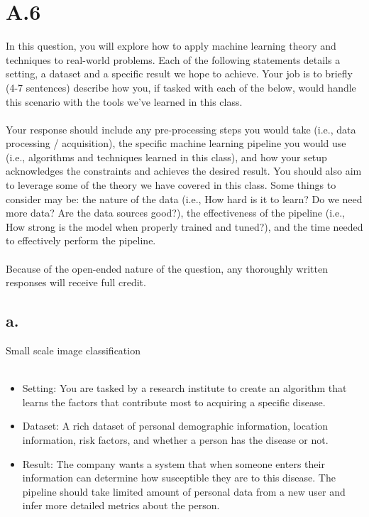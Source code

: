 \documentclass{article}
\newcommand{\1}{\mathbf{1}}
\begin{document}
\section*{A.6}
{\Large 

In this question, you will explore how to apply machine learning theory and techniques to real-world problems. Each of the following statements details a setting, a dataset and a specific result we hope to achieve. Your job is to briefly (4-7 sentences) describe how you, if tasked with each of the below, would handle this scenario with the tools we’ve learned in this class. \\ \\
Your response should include any pre-processing steps you would take (i.e., data processing / acquisition), the specific machine learning pipeline you would use (i.e., algorithms and techniques learned in this class), and how your setup acknowledges the constraints and achieves the desired result. You should also aim to leverage some of the theory we have covered in this class. Some things to consider may be: the nature of the data (i.e., How hard is it to learn? Do we need more data? Are the data sources good?), the effectiveness of the pipeline (i.e., How strong is the model when properly trained and tuned?), and the time needed to effectively perform the pipeline. \\ \\
Because of the open-ended nature of the question, any thoroughly written responses will receive full credit.

\subsection*{a.}

Small scale image classification \\ \\
\begin{itemize}
    \item Setting: You are tasked by a research institute to create an algorithm that learns the factors that contribute most to acquiring a specific disease.
    \item Dataset: A rich dataset of personal demographic information, location information, risk factors, and whether a person has the disease or not.
    \item Result: The company wants a system that when someone enters their information can determine how susceptible they are to this disease. The pipeline should take limited amount of personal data from a new user and infer more detailed metrics about the person.
\end{itemize}



}
\end{document}
